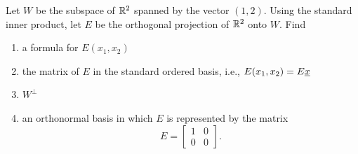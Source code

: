 \begin{problem}
Let $W$ be the subspace of $\mathbb{R}^2$ spanned by the vector $(1,2)$.
Using the standard inner product, let $E$ be the orthogonal projection of $\mathbb{R}^2$ onto $W$.
Find
\begin{enumerate}
\item a formula for $E(x_1, x_2)$
\item the matrix of $E$ in the standard ordered basis, i.e., $E(x_1, x_2) = E \underline{x}$
\item $W^{\bot}$
\item an orthonormal basis in which $E$ is represented by the matrix
\begin{equation*}
E = \begin{bmatrix} 1 & 0 \\ 0 & 0 \end{bmatrix} .
\end{equation*}
\end{enumerate}
\end{problem}



